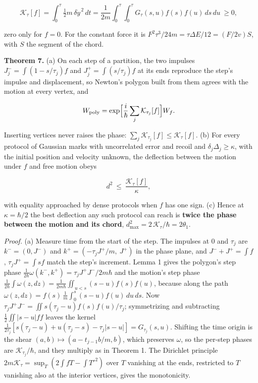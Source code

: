 \documentclass[11pt,a4paper]{article}
\begin{document}
\[\mathcal K_\tau[f]=\int_0^\tau\tfrac12m\,\delta\dot y^{\,2}\,dt
=\frac1{2m}\int_0^\tau\!\!\int_0^\tau G_\tau(s,u)f(s)f(u)\,ds\,du\ \ge0,\]

zero only for \(f=0\). For the constant force it is
\(F^2\tau^3/24m=\tau\Delta E/12=(F/2v)S\), with \(S\) the segment of the
chord.

\textbf{Theorem 7.} (a) On each step of a partition, the two impulses
\(J_j^-=\int(1-s/\tau_j)f\) and \(J_j^+=\int(s/\tau_j)f\) at its ends
reproduce the step's impulse and displacement, so Newton's polygon built
from them agrees with the motion at every vertex, and

\[W_{\rm poly}=\exp\Bigl[\frac{i}{\hbar}\sum_j\mathcal K_{\tau_j}[f]\Bigr]W_f .\]

Inserting vertices never raises the phase:
\(\sum_j\mathcal K_{\tau_j}[f]\le\mathcal K_\tau[f]\). (b) For every
protocol of Gaussian marks with uncorrelated error and recoil and
\(\delta_j\Delta_j\ge\kappa\), with the initial position and velocity
unknown, the deflection between the motion under \(f\) and free motion
obeys

\[d^2\ \le\ \frac{\mathcal K_\tau[f]}{\kappa},\]

with equality approached by dense protocols when \(f\) has one sign. (c)
Hence at \(\kappa=\hbar/2\) the best deflection any such protocol can
reach is \textbf{twice the phase between the motion and its chord},
\(d^2_{\max}=2\,\mathcal K_\tau/\hbar=2\theta_1\).

\emph{Proof.} (a) Measure time from the start of the step. The impulses
at \(0\) and \(\tau_j\) are \(k^-=(0,J^-)\) and
\(k^+=(-\tau_jJ^+/m,\ J^+)\) in the phase plane, and \(J^-+J^+=\int f\),
\(\tau_jJ^+=\int sf\) match the step's increment. Lemma 1 gives the
polygon's step phase
\(\frac1{2\hbar}\omega(k^-,k^+)=\tau_jJ^+J^-/2m\hbar\) and the motion's
step phase
\(\frac1{2\hbar}\int\omega(z,dz)=\frac1{2m\hbar}\iint_{u<s}(s-u)f(s)f(u)\),
because along the path
\(\omega(z,dz)=f(s)\,\frac1m\int_0^s(s-u)f(u)\,du\,ds\). Now
\(\tau_jJ^+J^-=\iint s(\tau_j-u)f(s)f(u)/\tau_j\); symmetrizing and
subtracting \(\frac12\iint|s-u|ff\) leaves the kernel
\(\frac1{2\tau_j}[s(\tau_j-u)+u(\tau_j-s)-\tau_j|s-u|]=G_{\tau_j}(s,u)\).
Shifting the time origin is the shear \((a,b)\mapsto(a-t_{j-1}b/m,b)\),
which preserves \(\omega\), so the per-step phases are
\(\mathcal K_{\tau_j}/\hbar\), and they multiply as in Theorem 1. The
Dirichlet principle \(2m\mathcal K_\tau=\sup_T(2\int fT-\int T'^2)\)
over \(T\) vanishing at the ends, restricted to \(T\) vanishing also at
the interior vertices, gives the monotonicity.
\end{document}

